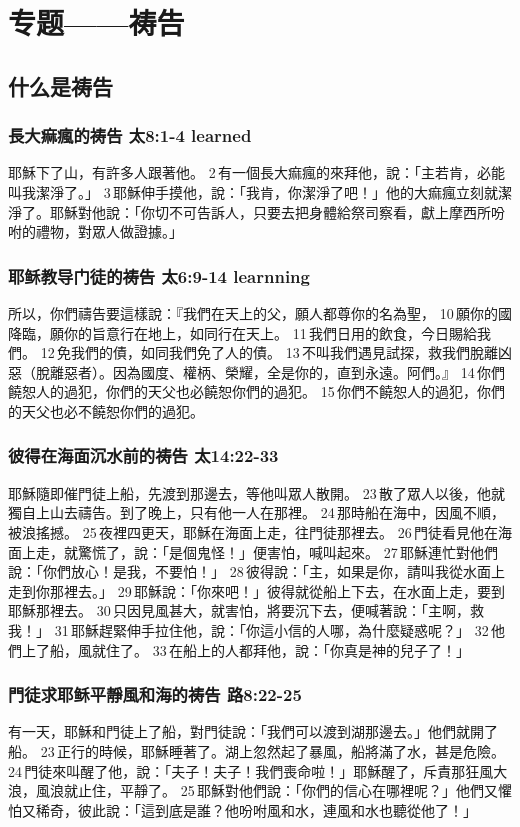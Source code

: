 \chapter{专题——祷告}
\section{什么是祷告}


\subsection{長大痲瘋的祷告 太8:1-4 learned}
耶穌下了山，有許多人跟著他。 2 有一個長大痲瘋的來拜他，說：「主若肯，必能叫我潔淨了。」 3 耶穌伸手摸他，說：「我肯，你潔淨了吧！」他的大痲瘋立刻就潔淨了。耶穌對他說：「你切不可告訴人，只要去把身體給祭司察看，獻上摩西所吩咐的禮物，對眾人做證據。」

\subsection{耶稣教导门徒的祷告 太6:9-14 learnning}
所以，你們禱告要這樣說：『我們在天上的父，願人都尊你的名為聖， 10 願你的國降臨，願你的旨意行在地上，如同行在天上。 11 我們日用的飲食，今日賜給我們。 12 免我們的債，如同我們免了人的債。 13 不叫我們遇見試探，救我們脫離凶惡（脫離惡者）。因為國度、權柄、榮耀，全是你的，直到永遠。阿們。』 14 你們饒恕人的過犯，你們的天父也必饒恕你們的過犯。 15 你們不饒恕人的過犯，你們的天父也必不饒恕你們的過犯。


\subsection{彼得在海面沉水前的祷告 太14:22-33}
耶穌隨即催門徒上船，先渡到那邊去，等他叫眾人散開。 23 散了眾人以後，他就獨自上山去禱告。到了晚上，只有他一人在那裡。 24 那時船在海中，因風不順，被浪搖撼。 25 夜裡四更天，耶穌在海面上走，往門徒那裡去。 26 門徒看見他在海面上走，就驚慌了，說：「是個鬼怪！」便害怕，喊叫起來。 27 耶穌連忙對他們說：「你們放心！是我，不要怕！」 28 彼得說：「主，如果是你，請叫我從水面上走到你那裡去。」 29 耶穌說：「你來吧！」彼得就從船上下去，在水面上走，要到耶穌那裡去。 30 只因見風甚大，就害怕，將要沉下去，便喊著說：「主啊，救我！」 31 耶穌趕緊伸手拉住他，說：「你這小信的人哪，為什麼疑惑呢？」 32 他們上了船，風就住了。 33 在船上的人都拜他，說：「你真是神的兒子了！」

\subsection{門徒求耶稣平靜風和海的祷告 路8:22-25}
有一天，耶穌和門徒上了船，對門徒說：「我們可以渡到湖那邊去。」他們就開了船。 23 正行的時候，耶穌睡著了。湖上忽然起了暴風，船將滿了水，甚是危險。 24 門徒來叫醒了他，說：「夫子！夫子！我們喪命啦！」耶穌醒了，斥責那狂風大浪，風浪就止住，平靜了。 25 耶穌對他們說：「你們的信心在哪裡呢？」他們又懼怕又稀奇，彼此說：「這到底是誰？他吩咐風和水，連風和水也聽從他了！」


